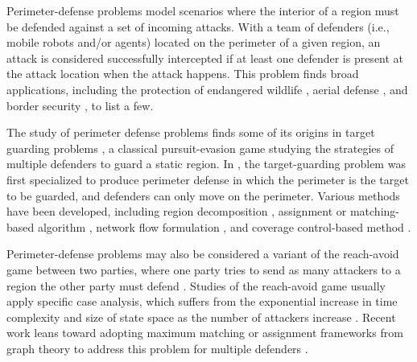 Perimeter-defense problems model scenarios where the interior of a region must be defended against a set of incoming attacks.
%
With a team of defenders (i.e., mobile robots and/or agents) located on the perimeter of a given region, an attack is considered successfully intercepted if at least one defender is present at the attack location when the attack happens. 
%
This problem finds broad applications, including the protection of endangered wildlife \cite{haksar2020spatial}, aerial defense \cite{lykou2020defending, lee2020perimeter}, and border security \cite{agmon2008multi, fengyu2020optimally}, to list a few. 

The study of perimeter defense problems finds some of its origins in target guarding problems \cite{rufus1965}, a classical pursuit-evasion game studying the strategies of multiple defenders to guard a static region.
%
In \cite{shishika2018local}, the target-guarding problem was first specialized to produce perimeter defense in which the perimeter is the target to be guarded, and defenders can only move on the perimeter. 
%
Various methods have been developed, including region decomposition \cite{shishika2018local}, assignment or matching-based algorithm \cite{shishika2020cooperative}, network flow formulation \cite{chen2021optimal}, and coverage control-based method \cite{macharet2020adaptive}.

Perimeter-defense problems may also be considered a variant of the reach-avoid game between two parties, where one party tries to send as many attackers to a region the other party must defend \cite{rufus1965}. 
%
Studies of the reach-avoid game usually apply specific case analysis, which suffers from the exponential increase in time complexity and size of state space as the number of attackers increase \cite{margellos2011hamilton, zhou2012general, yan2018reach}. 
%
Recent work leans toward adopting maximum matching or assignment frameworks from graph theory to address this problem for multiple defenders \cite{chen2014path, chen2014multiplayer, yan2019matching}.


